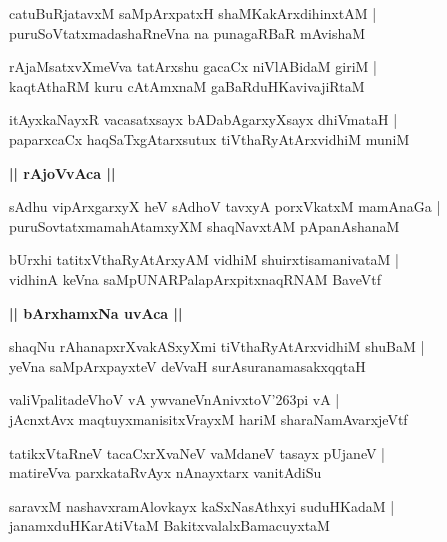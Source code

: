 \documentclass[twoside,12pt,openright]{book}
\def\S{\char'263}
\newcounter{shloka}[chapter]
\def\uvaca#1{\centerline{{\large\textbf{#1}}}}
\begin{document}
\begin{shloka}%
catuBuRjatavxM saMpArxpatxH shaMKakArxdihinxtAM |\\
puruSoVtatxmadashaRneVna na punagaRBaR mAvishaM 
\end{shloka}

\begin{shloka}%
rAjaMsatxvXmeVva tatArxshu gacaCx niVlABidaM giriM |\\
kaqtAthaRM kuru cAtAmxnaM gaBaRduHKavivajiRtaM
\end{shloka}

\begin{shloka}%
itAyxkaNayxR vacasatxsayx bADabAgarxyXsayx dhiVmataH |\\
paparxcaCx haqSaTxgAtarxsutux  tiVthaRyAtArxvidhiM muniM 
\end{shloka}

\uvaca{|| rAjoVvAca ||}

\begin{shloka}%
sAdhu vipArxgarxyX heV sAdhoV tavxyA porxVkatxM mamAnaGa |\\
puruSovtatxmamahAtamxyXM shaqNavxtAM pApanAshanaM 
\end{shloka}

\begin{shloka}%
bUrxhi tatitxVthaRyAtArxyAM vidhiM shuirxtisamanivataM |\\
vidhinA keVna saMpUNARPalapArxpitxnaqRNAM BaveVtf 
\end{shloka}

\uvaca{|| bArxhamxNa uvAca ||}

\begin{shloka}%
shaqNu rAhanapxrXvakASxyXmi tiVthaRyAtArxvidhiM shuBaM |\\
yeVna saMpArxpayxteV deVvaH surAsuranamasakxqqtaH 
\end{shloka}

\begin{shloka}%
valiVpalitadeVhoV vA ywvaneVnAnivxtoV\S pi vA |\\
jAcnxtAvx maqtuyxmanisitxVrayxM hariM sharaNamAvarxjeVtf 
\end{shloka}

\begin{shloka}%
tatikxVtaRneV tacaCxrXvaNeV vaMdaneV tasayx pUjaneV |\\
matireVva parxkataRvAyx nAnayxtarx vanitAdiSu
\end{shloka}

\begin{shloka}%
saravxM nashavxramAlovkayx kaSxNasAthxyi suduHKadaM |\\
janamxduHKarAtiVtaM BakitxvalalxBamacuyxtaM 
\end{shloka}
\end{document}
